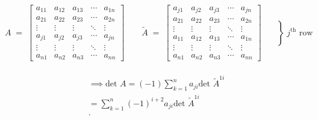 \documentclass{report}
\begin{document}
{\[                      \] \[
                                A \;=\;
\begin{bmatrix}
a_{11} & a_{12} & a_{13} & \cdots & a_{1n}\\
a_{21} & a_{22} & a_{23} & \cdots & a_{2n}\\
\vdots & \vdots & \vdots & \ddots & \vdots\\
a_{j1} & a_{j2} & a_{j3} & \cdots & a_{jn}\\
\vdots & \vdots & \vdots & \ddots & \vdots\\
a_{n1} & a_{n2} & a_{n3} & \cdots & a_{nn}
\end{bmatrix}
\qquad
\widetilde{A} \;=\;
\left[
\begin{array}{ccccc}
a_{j1} & a_{j2} & a_{j3} & \cdots & a_{jn}\\
a_{21} & a_{22} & a_{23} & \cdots & a_{2n}\\
\vdots & \vdots & \vdots & \ddots & \vdots\\
a_{11} & a_{12} & a_{13} & \cdots & a_{1n}\\
\vdots & \vdots & \vdots & \ddots & \vdots\\
a_{n1} & a_{n2} & a_{n3} & \cdots & a_{nn}
\end{array}
\right]
\quad
\left.
\begin{array}{c}
\\[-1.2em]\\ \\ \\ \\[-0.6em]
\end{array}
\right\}
\; \text{\(j^{\text{th}}\) row}
                       \]     \\
        \begin{align*}
                \implies \text{det } A = \left( -1 \right) \sum\limits_{k=1}^{n} a_{ji} \text{det } \tilde{ A }   ^{1i}\\
                = \sum\limits_{k=1}^{n} \left( -1 \right) ^{i+2} a_{ji} \text{det } \tilde{ A }   ^{1i}\\
        .\end{align*}
        \nt{
                \begin{align*}
                        \text{det } \tilde{ A }   ^{11}= \text{det } \!
\left[
\begin{array}{cccc}
a_{22} & a_{23} & \cdots & a_{2n}\\
\vdots & \vdots & \ddots & \vdots\\
a_{12} & a_{13} & \cdots & a_{1n}\\

\end{array}
\end{align*}}}
\end{document}
